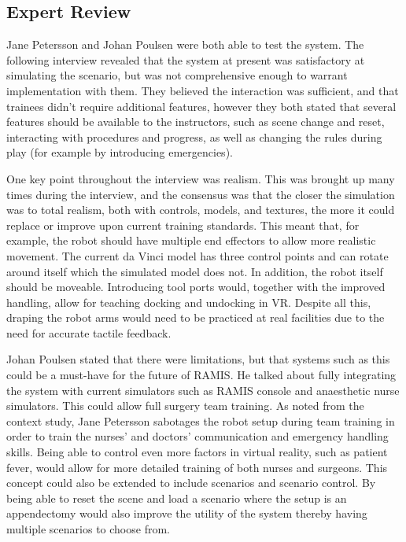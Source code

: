\subsection{Expert Review}
Jane Petersson and Johan Poulsen were both able to test the system. The following interview revealed that the system at present was satisfactory at simulating the scenario, but was not comprehensive enough to warrant implementation with them. They believed the interaction was sufficient, and that trainees didn’t require additional features, however they both stated that several features should be available to the instructors, such as scene change and reset, interacting with procedures and progress, as well as changing the rules during play (for example by introducing emergencies).

One key point throughout the interview was realism. This was brought up many times during the interview, and the consensus was that the closer the simulation was to total realism, both with controls, models, and textures, the more it could replace or improve upon current training standards. This meant that, for example, the robot should have multiple end effectors to allow more realistic movement. The current da Vinci model has three control points and can rotate around itself which the simulated model does not. In addition, the robot itself should be moveable. Introducing tool ports would, together with the improved handling, allow for teaching docking and undocking in VR. Despite all this, draping the robot arms would need to be practiced at real facilities due to the need for accurate tactile feedback.

Johan Poulsen stated that there were limitations, but that systems such as this could be a must-have for the future of RAMIS. He talked about fully integrating the system with current simulators such as RAMIS console and anaesthetic nurse simulators. This could allow full surgery team training. As noted from the context study, Jane Petersson sabotages the robot setup during team training in order to train the nurses’ and doctors’ communication and emergency handling skills. Being able to control even more factors in virtual reality, such as patient fever, would allow for more detailed training of both nurses and surgeons. This concept could also be extended to include scenarios and scenario control. By being able to reset the scene and load a scenario where the setup is an appendectomy would also improve the utility of the system thereby having multiple scenarios to choose from.

